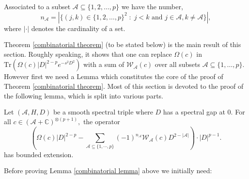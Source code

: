     Associated to a subset $\mathscr{A} \subseteq \{1,2,\ldots,p\}$ we have the number,
    \begin{equation*}
        n_\mathscr{A} = |\{(j,k) \in \{1,2,\ldots,p\}^2\;:\; j < k\text{ and }j \in \mathscr{A}, k\neq \mathscr{A}\}|,
    \end{equation*}
    where $|\cdot|$ denotes the cardinality of a set.

    Theorem \ref{combinatorial theorem} (to be stated below) is the main result of this section. Roughly speaking, it shows that one can replace $\Omega(c)$ in $\mathrm{Tr}(\Omega(c)|D|^{2-p}e^{-s^2D^2})$ with a sum of $\mathcal{W}_\mathscr{A}(c)$
    over all subsets $\mathscr{A} \subseteq \{1,\ldots,p\}$.
    However first we need a Lemma which constitutes the core of the proof of Theorem \ref{combinatorial theorem}. Most of this section is devoted to the proof of the following lemma, which is split into various parts.
    \begin{lem}\label{combinatorial lemma} 
        Let $(\mathcal{A},H,D)$ be a smooth spectral triple where $D$ has a spectral gap at $0.$ For all $c\in(\mathcal{A}+\mathbb{C})^{\otimes (p+1)},$ the operator
        \begin{equation*}
            \left(\Omega(c)|D|^{2-p}-\sum_{\mathscr{A}\subseteq \{1,\cdots,p\}}(-1)^{n_{\mathscr{A}}}\mathcal{W}_{\mathscr{A}}(c)D^{2-|\mathscr{A}|}\right)\cdot|D|^{p-1}.
        \end{equation*}
        has bounded extension.
    \end{lem}
        
    Before proving Lemma \ref{combinatorial lemma} above we initially need:

